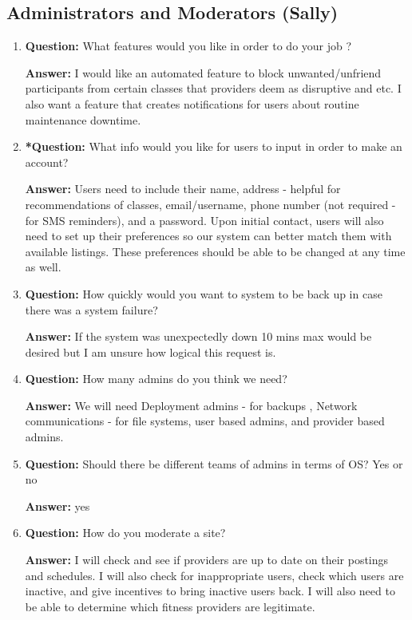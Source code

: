\documentclass[12pt]{article}
\begin{document}
\subsection{Administrators and Moderators (Sally)}
\begin{enumerate}
\item \textbf{Question:} What features would you like in order to do your job ? 

\textbf{Answer:} I would like an automated feature to block unwanted/unfriend participants from certain classes that providers deem as disruptive and etc.  I also want a feature that creates notifications for users about routine maintenance downtime.

\item \textbf{*Question:} What info would you like for users to input in order to make an account?

\textbf{Answer:} Users need to include their name, address - helpful for recommendations of classes, email/username, phone number (not required - for SMS reminders), and a password.  Upon initial contact, users will also need to set up their preferences so our system can better match them with available listings.  These preferences should be able to be changed at any time as well.

\item \textbf{Question:} How quickly would you want to system to be back up in case there was a system failure?
 
\textbf{Answer:} If the system was unexpectedly down 10 mins max would be desired but I am unsure how logical this request is.

\item \textbf{Question:} How many admins do you think we need?

\textbf{Answer:} We will need Deployment admins - for backups , Network communications - for file systems, user based admins, and provider based admins.

\item \textbf{Question:} Should there be different teams of admins in terms of OS? Yes or no

\textbf{Answer:} yes

\item \textbf{Question:} How do you moderate a site?

\textbf{Answer:} I will check and see if providers are up to date on their postings and schedules.  I will also check for inappropriate users, check which users are inactive, and give incentives to bring inactive users back.  I will also need to be able to determine which fitness providers are legitimate.
\end{enumerate}
\end{document}
